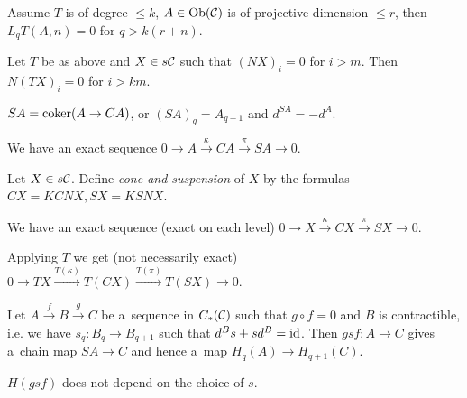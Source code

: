 



    \begin{theorem}
        Assume $T$ is of degree $\leq k$, 
        $A \in \operatorname{Ob}(\mathcal{C})$ is of projective dimension $\leq r$,
        then $L_qT(A,n) = 0$ for $q > k(r+n)$.
    \end{theorem}
    
    \begin{lemma}
        Let $T$ be as above and $X \in s\mathcal{C}$ such that
        $(NX)_i = 0$ for $i>m$.
        Then $N(TX)_i = 0$ for $i>km$.
    \end{lemma}
    
    \begin{definition}[suspension]
        $SA = \operatorname{coker}(A \to CA)$,
        or $(SA)_q = A_{q-1}$ and $d^{SA} = - d^A$.
    \end{definition}
    
    \begin{corollary}
        We have an exact sequence
        $0 \to A \xrightarrow \kappa CA \xrightarrow \pi SA \to 0$.
    \end{corollary}
    
    \begin{definition}
        Let $X \in s\mathcal{C}$. 
        Define {\em cone and suspension} of $X$ by the formulas \\
        $CX = KCNX, SX = KSNX$.
    \end{definition}
    
    \begin{remark}
        We have an exact sequence (exact on each level)
        $0 \to X \xrightarrow \kappa CX \xrightarrow \pi SX \to 0$.
        
        Applying $T$ we get (not necessarily exact)
        $0 \to TX \xrightarrow{T(\kappa)} T(CX) \xrightarrow{T(\pi)}T(SX) \to 0$.
    \end{remark}
    
    \begin{remark}
        Let $A \xrightarrow f B \xrightarrow g C$ be a~sequence in $C_\ast(\mathcal{C})$
        such that $g \circ f = 0$ and $B$ is contractible,
        i.e. we have $s_q:B_q \to B_{q+1}$ such that $d^B s + sd^B = \mathrm{id}$.
        Then $gsf:A \to C$ gives a~chain map $SA \to C$
        and hence a~map $H_q(A) \to H_{q+1}(C)$.
    \end{remark}
    
    \begin{theorem}
        $H(gsf)$ does not depend on the choice of $s$.
    \end{theorem}
    
